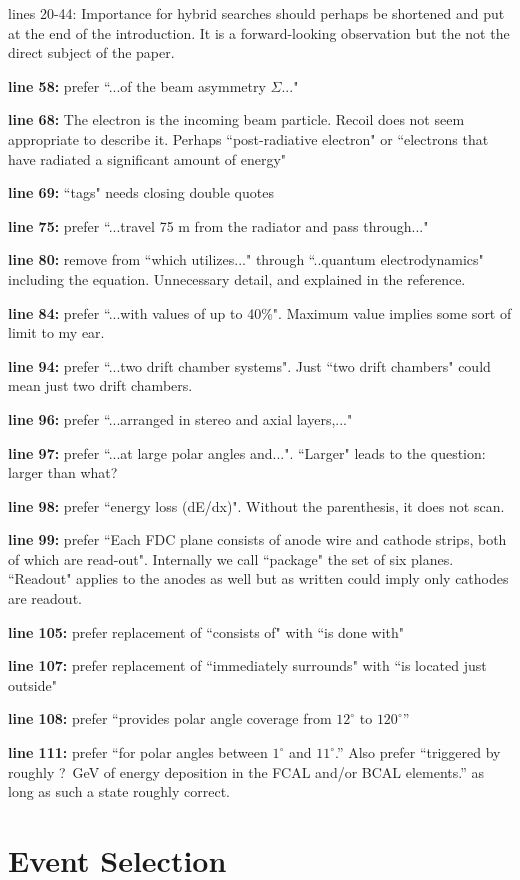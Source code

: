 \documentclass{article}
\newcommand{\itm}[1]{\item{\bf line #1:}}
\begin{document}
\begin{description}
\item{lines 20-44:} Importance for hybrid searches should perhaps be shortened and put at the end of the introduction. It is a forward-looking observation but the not the direct subject of the paper.
\itm{58} prefer ``...of the beam asymmetry $\Sigma$..."
\itm{68} The electron is the incoming beam particle. Recoil does not seem appropriate to describe it. Perhaps ``post-radiative electron" or ``electrons that have radiated a significant amount of energy"
\itm{69} ``tags" needs closing double quotes
\itm{75} prefer ``...travel 75 m from the radiator and pass through..."
\itm{80} remove from ``which utilizes..." through ``..quantum electrodynamics" including the equation. Unnecessary detail, and explained in the reference.
\itm{84} prefer ``...with values of up to 40\%". Maximum value implies some sort of limit to my ear.
\itm{94} prefer ``...two drift chamber systems". Just ``two drift chambers" could mean just two drift chambers.
\itm{96} prefer ``...arranged in stereo and axial layers,..."
\itm{97} prefer ``...at large polar angles and...". ``Larger" leads to the question: larger than what?
\itm{98} prefer ``energy loss (dE/dx)". Without the parenthesis, it does not scan.
\itm{99} prefer ``Each FDC plane consists of anode wire and cathode strips, both of which are read-out". Internally we call ``package" the set of six planes. ``Readout" applies to the anodes as well but as written could imply only cathodes are readout.
\itm{105} prefer replacement  of ``consists of" with ``is done with" 
\itm{107} prefer replacement of ``immediately surrounds" with ``is located just outside"
\itm{108} prefer ``provides polar angle coverage from $12^\circ$ to $120^\circ$''
\itm{111} prefer ``for polar angles between $1^\circ$ and $11^\circ$.'' Also prefer ``triggered by roughly ?~GeV of energy deposition in the FCAL and/or BCAL elements.'' as long as such a state roughly correct.
\end{description}

\section{Event Selection}
\end{document}
